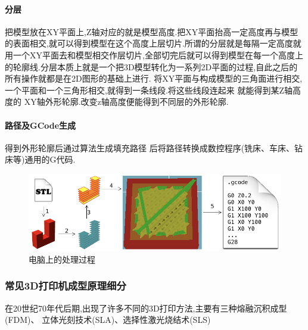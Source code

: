 \documentclass[a4paper,12pt,onecolumn,twoside]{article}
\begin{document}
\paragraph{分层}
把模型放在XY平面上,Z轴对应的就是模型高度.把XY平面抬高一定高度再与模型的表面相交,就可以得到模型在这个高度上层切片.所谓的分层就是每隔一定高度就用一个XY平面去和模型相交作层切片,全部切完后就可以得到模型在每一个高度上的轮廓线.分层本质上就是一个把3D模型转化为一系列2D平面的过程,自此之后的所有操作就都是在2D图形的基础上进行.
将XY平面与构成模型的三角面进行相交,一个平面和一个三角形相交,就得到一条线段.将这些线段连起来 就能得到某Z轴高度的 XY轴外形轮廓.改变z轴高度便能得到不同层的外形轮廓.
\paragraph{路径及GCode生成}
得到外形轮廓后通过算法生成填充路径 后将路径转换成数控程序(铣床、车床、钻床等)通用的G代码.
\begin{figure}[htbp]
\centering
\includegraphics[width=0.9\linewidth]{stlToGcode.png}
\caption{电脑上的处理过程}
\end{figure}
\subsubsection{常见3D打印机成型原理细分}
在20世纪70年代后期,出现了许多不同的3D打印方法,主要有三种熔融沉积成型(FDM)、
立体光刻技术(SLA)、选择性激光烧结术(SLS)
\end{document}
